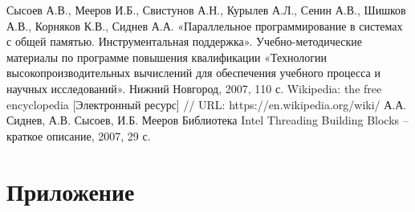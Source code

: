 \documentclass{report}
\begin{document}
\newpage
\begin{thebibliography}{1}
 Сысоев А.В., Мееров И.Б., Свистунов А.Н., Курылев А.Л., Сенин А.В., Шишков А.В., Корняков К.В., Сиднев А.А. «Параллельное программирование в системах с общей памятью. Инструментальная поддержка». Учебно-методические материалы по программе повышения квалификации «Технологии высокопроизводительных вычислений для обеспечения учебного процесса и научных исследований». Нижний Новгород, 2007, 110 с. 
 Wikipedia: the free encyclopedia [Электронный ресурс] // URL: https://en.wikipedia.org/wiki/
 А.А. Сиднев, А.В. Сысоев, И.Б. Мееров Библиотека Intel Threading Building Blocks – краткое описание, 2007, 29 с. 
\end{thebibliography}
\newpage


\section*{Приложение}
\end{document}
